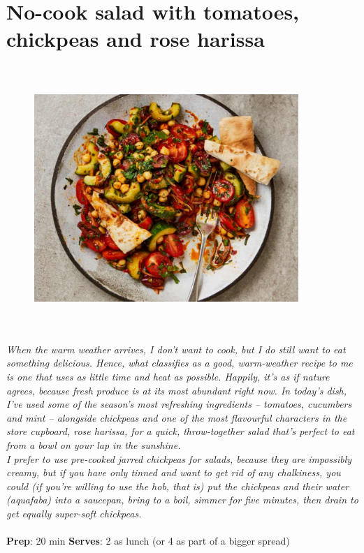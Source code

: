 \documentclass{book}
\begin{document}
\section{No-cook salad with tomatoes, chickpeas and rose harissa}
\begin{figure}
\centering\includegraphics[width=10cm,height=10cm,keepaspectratio]{Recipe_Pictures/No-cook_salad_with_tomatoes,_chickpeas_and_rose_harissa.png}
\end{figure}
\emph{When the warm weather arrives, I don’t want to cook, but I do still want to eat something delicious. Hence, what classifies as a good, warm-weather recipe to me is one that uses as little time and heat as possible. Happily, it’s as if nature agrees, because fresh produce is at its most abundant right now. In today’s dish, I’ve used some of the season’s most refreshing ingredients – tomatoes, cucumbers and mint – alongside chickpeas and one of the most flavourful characters in the store cupboard, rose harissa, for a quick, throw-together salad that’s perfect to eat from a bowl on your lap in the sunshine.\\ 
I prefer to use pre-cooked jarred chickpeas for salads, because they are impossibly creamy, but if you have only tinned and want to get rid of any chalkiness, you could (if you’re willing to use the hob, that is) put the chickpeas and their water (aquafaba) into a saucepan, bring to a boil, simmer for five minutes, then drain to get equally super-soft chickpeas.}\\\\ 
\textbf{Prep}: 20 min
\textbf{Serves}: 2 as lunch (or 4 as part of a bigger spread)
\end{document}
